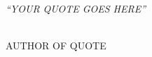\thispagestyle{empty}
\vspace*{\fill}

\begin{flushright}
\large {\em ``YOUR QUOTE GOES HERE''} 
\\

\ \

\normalsize
{AUTHOR OF QUOTE}
\end{flushright}




\vspace*{\fill}

\vspace*{\fill}

\vspace*{\fill}

